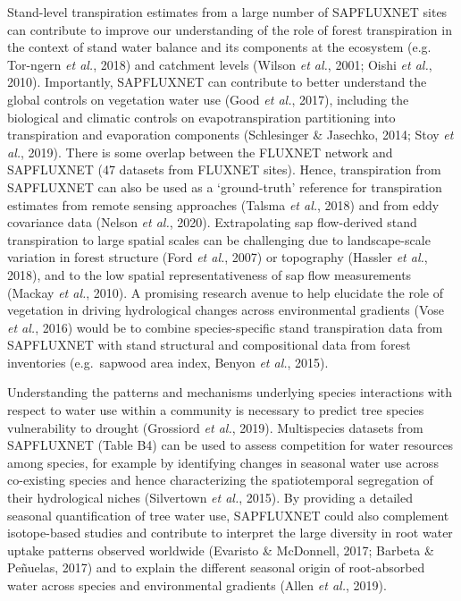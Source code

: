 \documentclass[11pt,twoside]{reedthesis}
\begin{document}
Stand-level transpiration estimates from a large number of SAPFLUXNET
sites can contribute to improve our understanding of the role of forest
transpiration in the context of stand water balance and its components
at the ecosystem (e.g. Tor-ngern \emph{et al.}, 2018) and catchment
levels (Wilson \emph{et al.}, 2001; Oishi \emph{et al.}, 2010).
Importantly, SAPFLUXNET can contribute to better understand the global
controls on vegetation water use (Good \emph{et al.}, 2017), including
the biological and climatic controls on evapotranspiration partitioning
into transpiration and evaporation components (Schlesinger \& Jasechko,
2014; Stoy \emph{et al.}, 2019). There is some overlap between the
FLUXNET network and SAPFLUXNET (47 datasets from FLUXNET sites). Hence,
transpiration from SAPFLUXNET can also be used as a `ground-truth'
reference for transpiration estimates from remote sensing approaches
(Talsma \emph{et al.}, 2018) and from eddy covariance data (Nelson
\emph{et al.}, 2020). Extrapolating sap flow-derived stand transpiration
to large spatial scales can be challenging due to landscape-scale
variation in forest structure (Ford \emph{et al.}, 2007) or topography
(Hassler \emph{et al.}, 2018), and to the low spatial representativeness
of sap flow measurements (Mackay \emph{et al.}, 2010). A promising
research avenue to help elucidate the role of vegetation in driving
hydrological changes across environmental gradients (Vose \emph{et al.},
2016) would be to combine species-specific stand transpiration data from
SAPFLUXNET with stand structural and compositional data from forest
inventories (e.g.~sapwood area index, Benyon \emph{et al.}, 2015).\par

Understanding the patterns and mechanisms underlying species
interactions with respect to water use within a community is necessary
to predict tree species vulnerability to drought (Grossiord \emph{et
al.}, 2019). Multispecies datasets from SAPFLUXNET (Table B4) can be
used to assess competition for water resources among species, for
example by identifying changes in seasonal water use across co-existing
species and hence characterizing the spatiotemporal segregation of their
hydrological niches (Silvertown \emph{et al.}, 2015). By providing a
detailed seasonal quantification of tree water use, SAPFLUXNET could
also complement isotope-based studies and contribute to interpret the
large diversity in root water uptake patterns observed worldwide
(Evaristo \& McDonnell, 2017; Barbeta \& Peñuelas, 2017) and to explain
the different seasonal origin of root-absorbed water across species and
environmental gradients (Allen \emph{et al.}, 2019).\par
\end{document}
